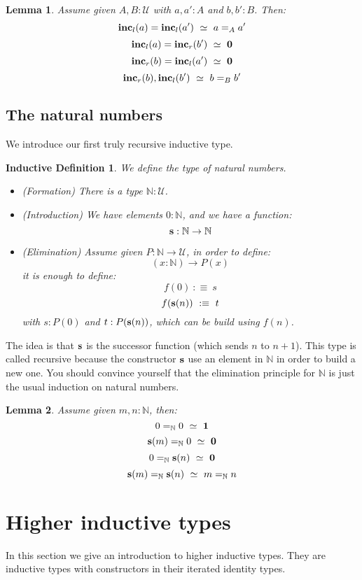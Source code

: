 \documentclass{article}
\newcommand{\se}[1]{\medbreak \medbreak \section{#1}}
\newcommand{\sse}[1]{\medbreak \subsection{#1}}
\newcommand{\U}{{\mathcal U}}
\renewcommand{\r}{\rightarrow}
\newcommand{\one}{{\bf 1}}
\newcommand{\zero}{{\bf 0}}
\newcommand{\s}{\mathrm{\bf s}}
\newcommand{\inc}{\mathrm{\bf inc}}
\newtheorem{lemma}{Lemma}
\newtheorem{ind_def}{Inductive Definition}
\begin{document}

\begin{lemma}
Assume given $A,B:\U$ with $a,a':A$ and $b,b':B$. Then:
\[\inc_l(a) = \inc_l(a') \ \simeq \ a=_Aa'\]
\[\inc_l(a) = \inc_r(b')\ \simeq \ \zero\]
\[\inc_r(b) = \inc_l(a') \ \simeq \ \zero\]
\[\inc_r(b),\inc_l(b') \ \simeq \ b=_Bb'\]
\end{lemma}


\sse{The natural numbers}

We introduce our first truly recursive inductive type.

\begin{ind_def}
We define the type of natural numbers.
\begin{itemize}
\item (Formation) There is a type $\mathbb{N}:\U$.
\item (Introduction) We have elements $0:\mathbb{N}$, and we have a function:
\[\s : \mathbb{N} \r \mathbb{N}\]
\item (Elimination) Assume given $P:\mathbb{N}\r \U$, in order to define:
\[(x:\mathbb{N})\r P(x)\]
it is enough to define:
\[f(0) \ :\equiv\ s\]
\[f(\s(n)) \ :\equiv\ t\]
with $s:P(0)$ and $t:P(\s(n))$, which can be build using $f(n)$.
\end{itemize}
\end{ind_def}

The idea is that $\s$ is the successor function (which sends $n$ to $n+1$). This type is called recursive because the constructor $\s$ use an element in $\mathbb{N}$ in order to build a new one. You should convince yourself that the elimination principle for $\mathbb{N}$ is just the usual induction on natural numbers.

\begin{lemma}
Assume given $m,n:\mathbb{N}$, then:
\[0=_\mathbb{N}0\ \simeq\ \one\]
\[\s(m)=_\mathbb{N}0\ \simeq\ \zero\]
\[0=_\mathbb{N}\s(n)\ \simeq\ \zero\]
\[\s(m)=_\mathbb{N}\s(n)\ \simeq\ m=_\mathbb{N}n\]
\end{lemma}




\se{Higher inductive types}

In this section we give an introduction to higher inductive types. They are inductive types with constructors in their iterated identity types.
\end{document}
